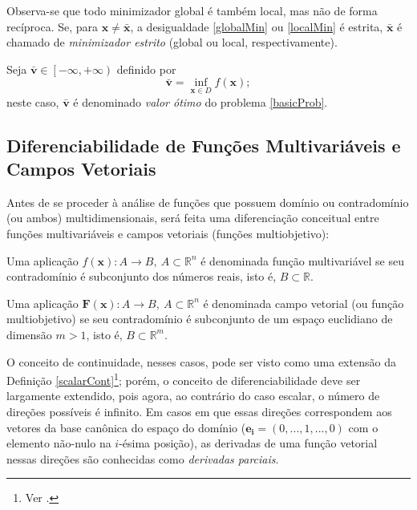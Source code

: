 Observa-se que todo minimizador global \'{e} tamb\'{e}m local, mas n\~{a}o de forma rec\'{i}proca. Se, para $\mathbf{x} \ne \bar{\mathbf{x}}$, a desigualdade \eqref{globalMin} ou \eqref{localMin} \'{e} estrita, $\bar{\mathbf{x}}$ \'{e} chamado de \textit{minimizador estrito} (global ou local, respectivamente).

\begin{definition} 
Seja $\bar{\mathbf{v}} \in \left[ -\infty,+\infty \right)$ definido por
\begin{equation}
\bar{\mathbf{v}} = \inf_{\mathbf{x} \in D} f(\mathbf{x});
\end{equation}
neste caso, $\bar{\mathbf{v}}$ \'{e} denominado \textit{valor \'{o}timo} do problema \eqref{basicProb}.
\end{definition} 

\subsection{Diferenciabilidade de Fun\c{c}\~{o}es Multivari\'{a}veis e Campos Vetoriais}

Antes de se proceder \`{a} an\'{a}lise de fun\c{c}\~{o}es que possuem dom\'{i}nio ou contradom\'{i}nio (ou ambos) multidimensionais, ser\'{a} feita uma diferencia\c{c}\~{a}o conceitual entre fun\c{c}\~{o}es multivari\'{a}veis e campos vetoriais (fun\c{c}\~{o}es multiobjetivo):

\begin{definition}
Uma aplica\c{c}\~{a}o $f(\mathbf{x}): A \to B,~ A \subset \mathbb{R}^{n}$ \'{e} denominada fun\c{c}\~{a}o multivari\'{a}vel se seu contradom\'{i}nio \'{e} subconjunto dos n\'{u}meros reais, isto \'{e}, $B \subset \mathbb{R}$.
\end{definition}

\begin{definition}
Uma aplica\c{c}\~{a}o $\mathbf{F}(\mathbf{x}): A \to B,~ A \subset \mathbb{R}^{n}$ \'{e} denominada campo vetorial (ou fun\c{c}\~{a}o multiobjetivo) se seu contradom\'{i}nio \'{e} subconjunto de um espa\c{c}o euclidiano de dimens\~{a}o $m > 1$, isto \'{e}, $B \subset \mathbb{R}^{m}$.
\end{definition}

O conceito de continuidade, nesses casos, pode ser visto como uma extens\~{a}o da Defini\c{c}\~{a}o \ref{scalarCont}\footnote{Ver \cite[p. 301]{thomas2}.}; por\'{e}m, o conceito de diferenciabilidade deve ser largamente extendido, pois agora, ao contr\'{a}rio do caso escalar, o n\'{u}mero de dire\c{c}\~{o}es poss\'{i}veis \'{e} infinito. Em casos em que essas dire\c{c}\~{o}es correspondem aos vetores da base can\^{o}nica do espa\c{c}o do dom\'{i}nio ($\mathbf{e_i} = (0,...,1,...,0)$ com o elemento n\~{a}o-nulo na $i$-\'{e}sima posi\c{c}\~{a}o), as derivadas de uma fun\c{c}\~{a}o vetorial nessas dire\c{c}\~{o}es s\~{a}o conhecidas como \textit{derivadas parciais}.

